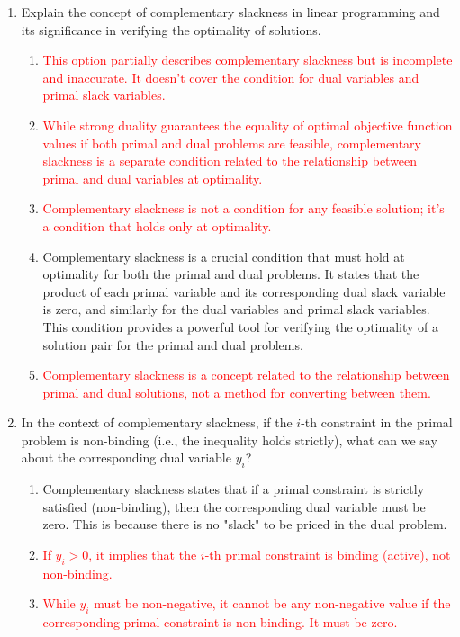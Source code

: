 \documentclass{article}%
\newcommand{\incorrect}[1]{\textcolor{red}{#1}}
\begin{document}
\begin{enumerate}
\vspace{1em}%
\item Explain the concept of complementary slackness in linear programming and its significance in verifying the optimality of solutions.%
\begin{enumerate}%
\item \incorrect{This option partially describes complementary slackness but is incomplete and inaccurate. It doesn't cover the condition for dual variables and primal slack variables.}%
\item \incorrect{While strong duality guarantees the equality of optimal objective function values if both primal and dual problems are feasible, complementary slackness is a separate condition related to the relationship between primal and dual variables at optimality.}%
\item \incorrect{Complementary slackness is not a condition for any feasible solution; it's a condition that holds only at optimality.}%
\item Complementary slackness is a crucial condition that must hold at optimality for both the primal and dual problems.  It states that the product of each primal variable and its corresponding dual slack variable is zero, and similarly for the dual variables and primal slack variables. This condition provides a powerful tool for verifying the optimality of a solution pair for the primal and dual problems.%
\item \incorrect{Complementary slackness is a concept related to the relationship between primal and dual solutions, not a method for converting between them.}%
\end{enumerate}%
\vspace{1em}%
\item In the context of complementary slackness, if the $i$-th constraint in the primal problem is non-binding (i.e., the inequality holds strictly), what can we say about the corresponding dual variable $y_i$?%
\begin{enumerate}%
\item Complementary slackness states that if a primal constraint is strictly satisfied (non-binding), then the corresponding dual variable must be zero.  This is because there is no "slack" to be priced in the dual problem.%
\item \incorrect{If $y_i > 0$, it implies that the $i$-th primal constraint is binding (active), not non-binding.}%
\item \incorrect{While $y_i$ must be non-negative, it cannot be any non-negative value if the corresponding primal constraint is non-binding. It must be zero.}%

\end{enumerate}
\end{enumerate}
\end{document}
